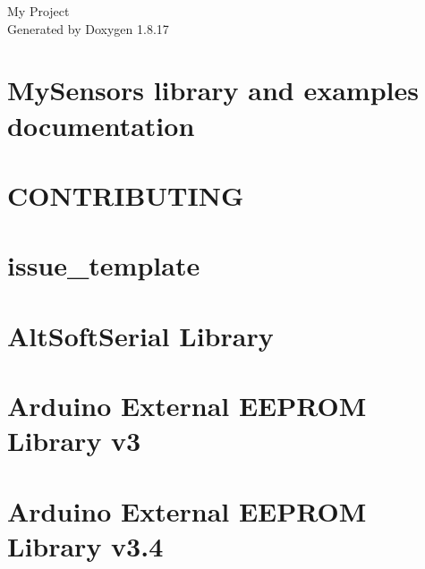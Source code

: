 \let\mypdfximage\pdfximage\def\pdfximage{\immediate\mypdfximage}\documentclass[twoside]{book}
\newcommand{\+}{\discretionary{\mbox{\scriptsize$\hookleftarrow$}}{}{}}
\newcommand{\clearemptydoublepage}{%
  \newpage{\pagestyle{empty}\cleardoublepage}%
}
\begin{document}
\hypersetup{pageanchor=false,
             bookmarksnumbered=true,
             pdfencoding=unicode
            }
\begin{titlepage}
\vspace*{7cm}
\begin{center}%
{\Large My Project }\\
\vspace*{1cm}
{\large Generated by Doxygen 1.8.17}\\
\end{center}
\end{titlepage}
\clearemptydoublepage
{}
\tableofcontents
\clearemptydoublepage
{}
\hypersetup{pageanchor=true}

\chapter{My\+Sensors library and examples documentation}
\label{index}\hypertarget{index}{}
\chapter{C\+O\+N\+T\+R\+I\+B\+U\+T\+I\+NG}
\label{md__c_o_n_t_r_i_b_u_t_i_n_g}

\chapter{issue\+\_\+template}
\label{md_drivers__alt_soft_serial_docs_issue_template}

\chapter{Alt\+Soft\+Serial Library}
\label{md_drivers__alt_soft_serial__r_e_a_d_m_e}

\chapter{Arduino External E\+E\+P\+R\+OM Library v3}
\label{md_drivers_ext_e_e_p_r_o_m__l_i_c_e_n_s_e}

\chapter{Arduino External E\+E\+P\+R\+OM Library v3.4}
\label{md_drivers_ext_e_e_p_r_o_m__read_me}

\end{document}
